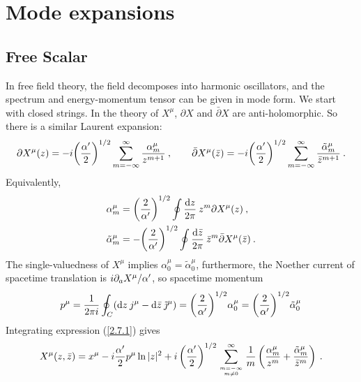 \section{\texorpdfstring{Mode expansions}{2.7 Mode expansions}} \label{sec:2.7}

\subsection*{Free Scalar}
In free field theory, the field decomposes into harmonic oscillators, and the spectrum and energy-momentum tensor can be given in mode form. We start with closed strings.    
In the theory of $X^\mu$, $\partial X$ and $\bar{\partial} X$ are anti-holomorphic. So there is a similar Laurent expansion:    
\begin{equation}\label{2.7.1}
	\partial X^{\mu}(z)=-i\biggl(\frac{\alpha^{\prime}}{2}\biggr)^{1 / 2} \sum_{m=-\infty}^{\infty} \frac{\alpha_{m}^{\mu}}{z^{m+1}}\:, \qquad 
	\bar{\partial} X^{\mu}(\bar{z})=-i\biggl(\frac{\alpha^{\prime}}{2}\biggr)^{1 / 2} \sum_{m=-\infty}^{\infty} \frac{\tilde{\alpha}_{m}^{\mu}}{\bar{z}^{m+1}} \:.
\end{equation}
Equivalently,    
\begin{subequations}\label{2.7.2}
	\begin{align}
		\alpha_{m}^{\mu}&=\biggl(\frac{2}{\alpha^{\prime}}\biggr)^{1 / 2} \oint \frac{\mathrm{d} z}{2 \pi}\: z^{m} \partial X^{\mu}(z) \:, \label{2.7.2a} \\
		\tilde{\alpha}_{m}^{\mu}&=-\biggl(\frac{2}{\alpha^{\prime}}\biggr)^{1 / 2} \oint \frac{\mathrm{d} \bar{z}}{2 \pi} \: \bar{z}^{m} \bar{\partial} X^{\mu}(\bar{z}) \:.
		\label{2.7.2b}
	\end{align}
\end{subequations}
The single-valuedness of $X^\mu$ implies $\alpha_{0}^{\mu}=\tilde{\alpha}_{0}^{\mu}$, furthermore, the Noether current of spacetime translation is $i \partial_{a} X^{\mu} / \alpha^{\prime}$, so spacetime momentum    
\begin{equation}\label{2.7.3}
	p^{\mu}=\frac{1}{2 \pi i} \oint_{C} (\mathrm{d} z \: j^{\mu}-\mathrm{d} \bar{z}\: \tilde{\jmath}^{\mu})
	=\biggl(\frac{2}{\alpha^{\prime}}\biggr)^{1 / 2} \alpha_{0}^{\mu}=\biggl(\frac{2}{\alpha^{\prime}}\biggr)^{1 / 2} \tilde{\alpha}_{0}^{\mu}
\end{equation}
Integrating expression (\ref{2.7.1}) gives    
\begin{equation}\label{2.7.4}
	X^{\mu}(z, \bar{z})=x^{\mu}- i \frac{\alpha^{\prime}}{2} p^{\mu} \ln |z|^{2}+i\left(\frac{\alpha^{\prime}}{2}\right)^{1 / 2} \sum_{m=-\infty \atop m \neq 0}^{\infty} \frac{1}{m}\left(\frac{\alpha_{m}^{\mu}}{z^{m}}+\frac{\tilde{\alpha}_{m}^{\mu}}{\bar{z}^{m}}\right) \:.
\end{equation}

